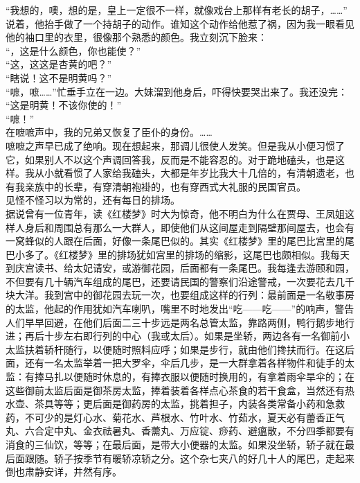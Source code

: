 “我想的，噢，想的是，皇上一定很不一样，就像戏台上那样有老长的胡子，……”\\

说着，他抬手做了一个持胡子的动作。谁知这个动作给他惹了祸，因为我一眼看见他的袖口里的衣里，很像那个熟悉的颜色。我立刻沉下脸来：\\

“，这是什么颜色，你也能使？”\\

“这，这这是杏黄的吧？”\\

“瞎说！这不是明黄吗？”\\

“嗻，嗻……”忙垂手立在一边。大妹溜到他身后，吓得快要哭出来了。我还没完：\\

“这是明黄！不该你使的！”\\

“嗻！”\\

在嗻嗻声中，我的兄弟又恢复了臣仆的身份。……\\

嗻嗻之声早已成了绝响。现在想起来，那调儿很使人发笑。但是我从小便习惯了它，如果别人不以这个声调回答我，反而是不能容忍的。对于跪地磕头，也是这样。我从小就看惯了人家给我磕头，大都是年岁比我大十几倍的，有清朝遗老，也有我亲族中的长辈，有穿清朝袍褂的，也有穿西式大礼服的民国官员。\\

见怪不怪习以为常的，还有每日的排场。\\

据说曾有一位青年，读《红楼梦》时大为惊奇，他不明白为什么在贾母、王凤姐这样人身后和周围总有那么一大群人，即使他们从这间屋走到隔壁那间屋去，也会有一窝蜂似的人跟在后面，好像一条尾巴似的。其实《红楼梦》里的尾巴比宫里的尾巴小多了。《红楼梦》里的排场犹如宫里的排场的缩影，这尾巴也颇相似。我每天到庆宫读书、给太妃请安，或游御花园，后面都有一条尾巴。我每逢去游颐和园，不但要有几十辆汽车组成的尾巴，还要请民国的警察们沿途警戒，一次要花去几千块大洋。我到宫中的御花园去玩一次，也要组成这样的行列：最前面是一名敬事房的太监，他起的作用犹如汽车喇叭，嘴里不时地发出“吃——吃——”的响声，警告人们早早回避，在他们后面二三十步远是两名总管太监，靠路两侧，鸭行鹅步地行进；再后十步左右即行列的中心（我或太后）。如果是坐轿，两边各有一名御前小太监扶着轿杆随行，以便随时照料应呼；如果是步行，就由他们搀扶而行。在这后面，还有一名太监举着一把大罗伞，伞后几步，是一大群拿着各样物件和徒手的太监：有捧马扎以便随时休息的，有捧衣服以便随时换用的，有拿着雨伞旱伞的；在这些御前太监后面是御茶房太监，捧着装着各样点心茶食的若干食盒，当然还有热水壶、茶具等等；更后面是御药房的太监，挑着担子，内装各类常备小药和急救药，不可少的是灯心水、菊花水、芦根水、竹叶水、竹茹水，夏天必有蕾香正气丸、六合定中丸、金衣祛暑丸、香薷丸、万应锭、痧药、避瘟散，不分四季都要有消食的三仙饮，等等；在最后面，是带大小便器的太监。如果没坐轿，轿子就在最后面跟随。轿子按季节有暖轿凉轿之分。这个杂七夹八的好几十人的尾巴，走起来倒也肃静安详，井然有序。\\

